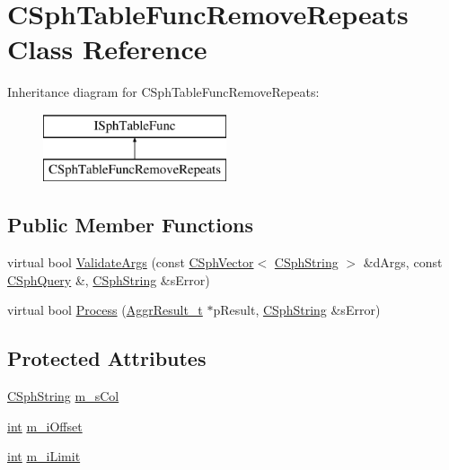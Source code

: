 \hypertarget{classCSphTableFuncRemoveRepeats}{\section{C\-Sph\-Table\-Func\-Remove\-Repeats Class Reference}
\label{classCSphTableFuncRemoveRepeats}
}
Inheritance diagram for C\-Sph\-Table\-Func\-Remove\-Repeats\-:\begin{figure}[H]
\begin{center}
\leavevmode
\includegraphics[height=2.000000cm]{classCSphTableFuncRemoveRepeats}
\end{center}
\end{figure}
\subsection*{Public Member Functions}
\begin{DoxyCompactItemize}
\item 
virtual bool \hyperlink{classCSphTableFuncRemoveRepeats_a3f2fad4e13523c9fdf86d2772b7e5073}{Validate\-Args} (const \hyperlink{classCSphVector}{C\-Sph\-Vector}$<$ \hyperlink{structCSphString}{C\-Sph\-String} $>$ \&d\-Args, const \hyperlink{classCSphQuery}{C\-Sph\-Query} \&, \hyperlink{structCSphString}{C\-Sph\-String} \&s\-Error)
\item 
virtual bool \hyperlink{classCSphTableFuncRemoveRepeats_afd19cf733cc01d4027ccb6a038ff35e2}{Process} (\hyperlink{structAggrResult__t}{Aggr\-Result\-\_\-t} $\ast$p\-Result, \hyperlink{structCSphString}{C\-Sph\-String} \&s\-Error)
\end{DoxyCompactItemize}
\subsection*{Protected Attributes}
\begin{DoxyCompactItemize}
\item 
\hyperlink{structCSphString}{C\-Sph\-String} \hyperlink{classCSphTableFuncRemoveRepeats_ad32804b2637e258723b8c395bbbdaf24}{m\-\_\-s\-Col}
\item 
\hyperlink{sphinxexpr_8cpp_a4a26e8f9cb8b736e0c4cbf4d16de985e}{int} \hyperlink{classCSphTableFuncRemoveRepeats_a6c429401d6a02e6781dcdf941cfba697}{m\-\_\-i\-Offset}
\item 
\hyperlink{sphinxexpr_8cpp_a4a26e8f9cb8b736e0c4cbf4d16de985e}{int} \hyperlink{classCSphTableFuncRemoveRepeats_ac2abf33ea9880a9acc21a78c1ef4a807}{m\-\_\-i\-Limit}
\end{DoxyCompactItemize}


